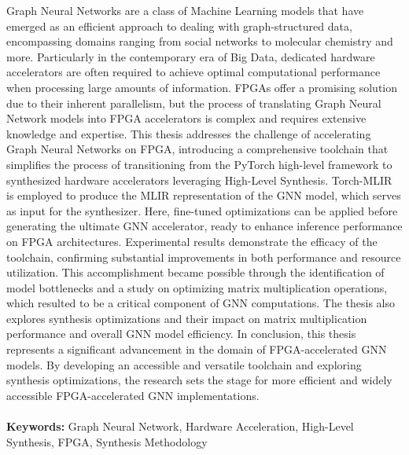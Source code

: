 Graph Neural Networks are a class of Machine Learning models that have emerged as an efficient approach to dealing with graph-structured data, encompassing domains ranging from social networks to molecular chemistry and more.
Particularly in the contemporary era of Big Data, dedicated hardware accelerators are often required to achieve optimal computational performance when processing large amounts of information.
FPGAs offer a promising solution due to their inherent parallelism, but the process of translating Graph Neural Network models into FPGA accelerators is complex and requires extensive knowledge and expertise.
This thesis addresses the challenge of accelerating Graph Neural Networks on FPGA, introducing a comprehensive toolchain that simplifies the process of transitioning from the PyTorch high-level framework to synthesized hardware accelerators leveraging High-Level Synthesis.
Torch-MLIR is employed to produce the MLIR representation of the GNN model, which serves as input for the synthesizer.
Here, fine-tuned optimizations can be applied before generating the ultimate GNN accelerator, ready to enhance inference performance on FPGA architectures.
Experimental results demonstrate the efficacy of the toolchain, confirming substantial improvements in both performance and resource utilization.
This accomplishment became possible through the identification of model bottlenecks and a study on optimizing matrix multiplication operations, which resulted to be a critical component of GNN computations.
The thesis also explores synthesis optimizations and their impact on matrix multiplication performance and overall GNN model efficiency.
In conclusion, this thesis represents a significant advancement in the domain of FPGA-accelerated GNN models.
By developing an accessible and versatile toolchain and exploring synthesis optimizations, the research sets the stage for more efficient and widely accessible FPGA-accelerated GNN implementations.
\\
\\
\textbf{Keywords:} Graph Neural Network, Hardware Acceleration, High-Level Synthesis, FPGA, Synthesis Methodology %